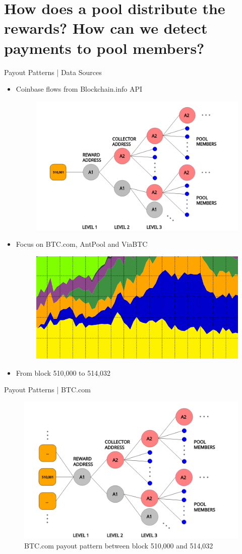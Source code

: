 \documentclass[10pt]{beamer}
\def\secondRQ{How does a pool distribute the rewards? How can we detect payments to pool members?}
\begin{document}
\section{\secondRQ}
\begin{frame}[fragile]{Payout Patterns | Data Sources}
    \begin{itemize}
        \item Coinbase flows from Blockchain.info API
        \begin{figure}
            \includegraphics[width=.4\textwidth]{images/flow_example.png}
        \end{figure}
        \pause

        \item Focus on BTC.com, AntPool and ViaBTC
        \begin{figure}
            \includegraphics[width=.35\textwidth]{images/selected_pools.png}
        \end{figure} 
        \pause
        \item From block 510,000 to 514,032

    \end{itemize}
\end{frame}

\begin{frame}[fragile]{Payout Patterns | BTC.com}
    \begin{figure}
        \includegraphics[width=.8\textwidth]{images/flow_BTCcom_example1.png}
        \\BTC.com payout pattern between block 510,000 and 514,032
    \end{figure}
\end{frame}
\end{document}
